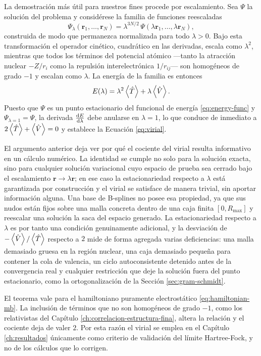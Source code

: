 La demostración más útil para nuestros fines procede por escalamiento. Sea $\Psi$ la solución del problema y considérese la familia de funciones reescaladas
\[
    \Psi_\lambda(\bm{r}_1,\dots,\bm{r}_N) = \lambda^{3N/2}\,\Psi(\lambda\bm{r}_1,\dots,\lambda\bm{r}_N),
\]
construida de modo que permanezca normalizada para todo $\lambda>0$. Bajo esta transformación el operador cinético, cuadrático en las derivadas, escala como $\lambda^2$, mientras que todos los términos del potencial atómico —tanto la atracción nuclear $-Z/r_i$ como la repulsión interelectrónica $1/r_{ij}$— son homogéneos de grado $-1$ y escalan como $\lambda$. La energía de la familia es entonces
\begin{equation}
    \label{eq:energia_escalada}
    E(\lambda) = \lambda^2 \ev{\hat{T}} + \lambda \ev{\hat{V}}.
\end{equation}
Puesto que $\Psi$ es un punto estacionario del funcional de energía \eqref{eq:energy-func} y $\Psi_{\lambda=1} = \Psi$, la derivada $\dv{E}{\lambda}$ debe anularse en $\lambda = 1$, lo que conduce de inmediato a $2\ev{\hat{T}} + \ev{\hat{V}} = 0$ y establece la Ecuación \eqref{eq:virial}.

El argumento anterior deja ver por qué el cociente del virial resulta informativo en un cálculo numérico. La identidad se cumple no solo para la solución exacta, sino para cualquier solución variacional cuyo espacio de prueba sea cerrado bajo el escalamiento $\bm{r} \to \lambda\bm{r}$; en ese caso la estacionariedad respecto a $\lambda$ está garantizada por construcción y el virial se satisface de manera trivial, sin aportar información alguna. Una base de B-splines no posee esa propiedad, ya que sus nudos están fijos sobre una malla concreta dentro de una caja finita $[0, R_{\text{max}}]$ y reescalar una solución la saca del espacio generado. La estacionariedad respecto a $\lambda$ es por tanto una condición genuinamente adicional, y la desviación de $-\ev{\hat{V}}/\ev{\hat{T}}$ respecto a $2$ mide de forma agregada varias deficiencias: una malla demasiado gruesa en la región nuclear, una caja demasiado pequeña para contener la cola de valencia, un ciclo autoconsistente detenido antes de la convergencia real y cualquier restricción que deje la solución fuera del punto estacionario, como la ortogonalización de la Sección \ref{sec:gram-schmidt}.

El teorema vale para el hamiltoniano puramente electrostático \eqref{eq:hamiltonian-mb}. La inclusión de términos que no son homogéneos de grado $-1$, como los relativistas del Capítulo \ref{ch:correlacion-estructura-fina}, altera la relación y el cociente deja de valer $2$. Por esta razón el virial se emplea en el Capítulo \ref{ch:resultados} únicamente como criterio de validación del límite Hartree-Fock, y no de los cálculos que lo corrigen.

